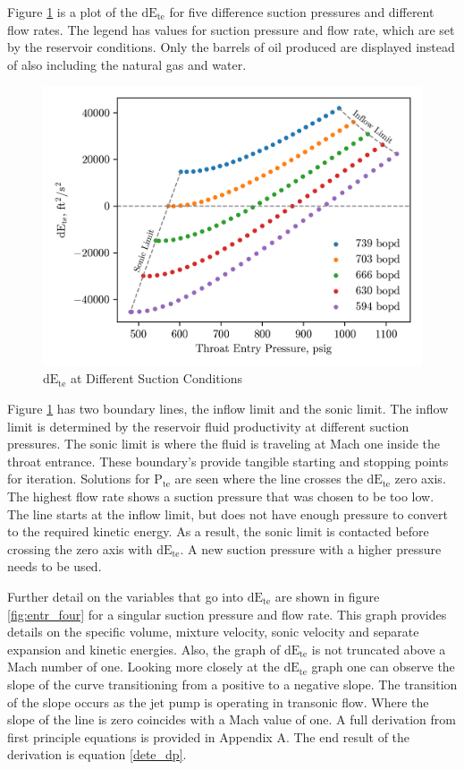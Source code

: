 \documentclass[12 pt]{report}
\newcommand{\dete}{$\mathrm{dE_{te}}$\xspace}  %
\newcommand{\pte}{$\mathrm{P_{te}}$\xspace}  %
\begin{document}
Figure \ref{fig:dete_multi} is a plot of the \dete{} for five difference suction pressures and different flow rates. The legend has values for suction pressure and flow rate, which are set by the reservoir conditions. Only the barrels of oil produced are displayed instead of also including the natural gas and water.

\begin{figure}
    \centering
    \includegraphics[scale=1]{figures/entry_multi.png}
    \caption{\dete at Different Suction Conditions}
    \label{fig:dete_multi}
\end{figure}

Figure \ref{fig:dete_multi} has two boundary lines, the inflow limit and the sonic limit. The inflow limit is determined by the reservoir fluid productivity at different suction pressures. The sonic limit is where the fluid is traveling at Mach one inside the throat entrance. These boundary's provide tangible starting and stopping points for iteration. Solutions for \pte{} are seen where the line crosses the \dete{} zero axis. The highest flow rate shows a suction pressure that was chosen to be too low. The line starts at the inflow limit, but does not have enough pressure to convert to the required kinetic energy. As a result, the sonic limit is contacted before crossing the zero axis with \dete{}. A new suction pressure with a higher pressure needs to be used.

Further detail on the variables that go into \dete{} are shown in figure \ref{fig:entr_four} for a singular suction pressure and flow rate. This graph provides details on the specific volume, mixture velocity, sonic velocity and separate expansion and kinetic energies. Also, the graph of \dete is not truncated above a Mach number of one. Looking more closely at the \dete graph one can observe the slope of the curve transitioning from a positive to a negative slope. The transition of the slope occurs as the jet pump is operating in transonic flow. Where the slope of the line is zero coincides with a Mach value of one. A full derivation from first principle equations is provided in Appendix A. The end result of the derivation is equation \eqref{dete_dp}.
\end{document}
